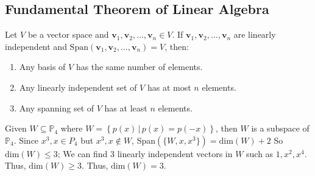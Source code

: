 \documentclass[11pt]{report}
\begin{document}
\subsection{Fundamental Theorem of Linear Algebra}
\begin{theorem}
    Let $V$ be a vector space and $\textbf{v}_1, \textbf{v}_2, \ldots, \textbf{v}_n \in V$. If $\textbf{v}_1, \textbf{v}_2, \ldots, \textbf{v}_n$ are linearly independent and $\text{Span}(\textbf{v}_1, \textbf{v}_2, \ldots, \textbf{v}_n) = V$, then:
    \begin{enumerate}
        \item Any basis of $V$ has the same number of elements.
        \item Any linearly independent set of $V$ has at most $n$ elements.
        \item Any spanning set of $V$ has at least $n$ elements.
    \end{enumerate}
\end{theorem}
\begin{example}
    Given $W \subseteq \mathbb{P}_4$ where $W = \left\{ p(x) \, | \, p(x) = p(-x) \right\}$, then $W$ is a subspace of $\mathbb{P}_4$. Since $x^3, x \in P_4$ but $x^3, x \notin W$,  Span$(\{W, x, x^3\}) = \mathrm{dim}(W) + 2$ So $\mathrm{dim}(W) \le 3$; We can find 3 linearly independent vectors in $W$ such as $1, x^2, x^4$. Thus, $\mathrm{dim}(W) \ge 3$. Thus, $\mathrm{dim}(W) = 3$.
\end{example}
\end{document}
